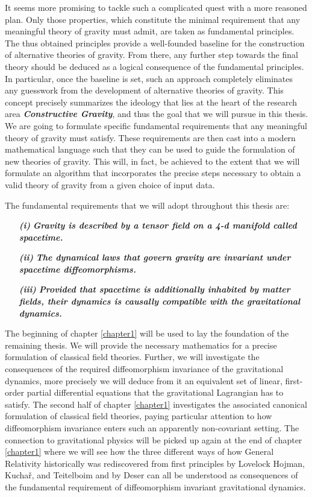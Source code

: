 It seems more promising to tackle such a complicated quest with a more reasoned plan. Only those properties, which constitute the minimal requirement that any meaningful theory of gravity must admit, are taken as fundamental principles. The thus obtained principles  provide a well-founded baseline for the construction of alternative theories of gravity. From there, any further step towards the final theory should be deduced as a logical consequence of the fundamental principles. In particular, once the baseline is set, such an approach completely eliminates any guesswork from the development of alternative theories of gravity. 
This concept precisely summarizes the ideology that lies at the heart of the research area \textit{\textbf{Constructive Gravity}}, and thus the goal that we will pursue in this thesis.
We are going to formulate specific fundamental requirements that any meaningful theory of gravity must satisfy. These requirements are then cast into a modern mathematical language such that they can be used to guide the formulation of new theories of gravity. This will, in fact, be achieved to the extent that we will formulate an algorithm that incorporates the precise steps necessary to obtain a valid theory of gravity from a given choice of input data. 

The fundamental requirements that we will adopt throughout this thesis are:
\begin{itemize}
    \item[\textbf{\textit{(i)}}] \textbf{\textit{Gravity is described by a tensor field on a 4-d manifold called spacetime.}}
    \item[\textbf{\textit{(ii)}}] \textbf{\textit{The dynamical laws that govern gravity are invariant under spacetime diffeomorphisms.}}
    \item[\textbf{\textit{(iii)}}] \textbf{\textit{Provided that spacetime is additionally inhabited by matter fields, their dynamics is causally compatible with the gravitational dynamics.}}
\end{itemize}

The beginning of chapter \ref{chapter1} will be used to lay the foundation of the remaining thesis. We will provide the necessary mathematics for a precise formulation of classical field theories. Further, we will investigate the consequences of the required diffeomorphism invariance of the gravitational dynamics, more precisely we will deduce from it an equivalent set of linear, first-order partial differential equations that the gravitational Lagrangian has to satisfy. The second half of chapter \ref{chapter1} investigates the associated canonical formulation of classical field theories, paying particular attention to how diffeomorphism invariance enters such an apparently non-covariant setting. The connection to gravitational physics will be picked up again at the end of chapter \ref{chapter1} where we will see how the three different ways of how General Relativity historically was rediscovered from first principles by Lovelock \cite{doi:10.1063/1.1665613} Hojman, Kuchař, and Teitelboim \cite{HOJMAN197688} and by Deser \cite{1970GReGr...1....9D} can all be understood as consequences of the fundamental requirement of diffeomorphism invariant gravitational dynamics.

